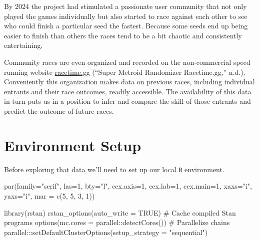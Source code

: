 \documentclass[
  letterpaper,
  DIV=11,
  numbers=noendperiod]{scrartcl}
\newenvironment{Shaded}{\begin{snugshade}}{\end{snugshade}}
\newcommand{\AttributeTok}[1]{\textcolor[rgb]{0.40,0.45,0.13}{#1}}
\newcommand{\CommentTok}[1]{\textcolor[rgb]{0.37,0.37,0.37}{#1}}
\newcommand{\ConstantTok}[1]{\textcolor[rgb]{0.56,0.35,0.01}{#1}}
\newcommand{\DecValTok}[1]{\textcolor[rgb]{0.68,0.00,0.00}{#1}}
\newcommand{\FunctionTok}[1]{\textcolor[rgb]{0.28,0.35,0.67}{#1}}
\newcommand{\NormalTok}[1]{\textcolor[rgb]{0.00,0.23,0.31}{#1}}
\newcommand{\SpecialCharTok}[1]{\textcolor[rgb]{0.37,0.37,0.37}{#1}}
\newcommand{\StringTok}[1]{\textcolor[rgb]{0.13,0.47,0.30}{#1}}
\begin{document}
By 2024 the project had stimulated a passionate user community that not
only played the games individually but also started to race against each
other to see who could finish a particular seed the fastest. Because
some seeds end up being easier to finish than others the races tend to
be a bit chaotic and consistently entertaining.

Community races are even organized and recorded on the non-commercial
speed running website \href{https://racetime.gg/smr}{racetime.gg}
({``Super Metroid Randomizer \textbar{} Racetime.gg,''} n.d.).
Conveniently this organization makes data on previous races, including
individual entrants and their race outcomes, readily accessible. The
availability of this data in turn puts us in a position to infer and
compare the skill of those entrants and predict the outcome of future
races.

\section{Environment Setup}\label{environment-setup}

Before exploring that data we'll need to set up our local \texttt{R}
environment.

\begin{Shaded}
\begin{Highlighting}[]
\FunctionTok{par}\NormalTok{(}\AttributeTok{family=}\StringTok{"serif"}\NormalTok{, }\AttributeTok{las=}\DecValTok{1}\NormalTok{, }\AttributeTok{bty=}\StringTok{"l"}\NormalTok{,}
    \AttributeTok{cex.axis=}\DecValTok{1}\NormalTok{, }\AttributeTok{cex.lab=}\DecValTok{1}\NormalTok{, }\AttributeTok{cex.main=}\DecValTok{1}\NormalTok{,}
    \AttributeTok{xaxs=}\StringTok{"i"}\NormalTok{, }\AttributeTok{yaxs=}\StringTok{"i"}\NormalTok{, }\AttributeTok{mar =} \FunctionTok{c}\NormalTok{(}\DecValTok{5}\NormalTok{, }\DecValTok{5}\NormalTok{, }\DecValTok{3}\NormalTok{, }\DecValTok{1}\NormalTok{))}

\FunctionTok{library}\NormalTok{(rstan)}
\FunctionTok{rstan\_options}\NormalTok{(}\AttributeTok{auto\_write =} \ConstantTok{TRUE}\NormalTok{)            }\CommentTok{\# Cache compiled Stan programs}
\FunctionTok{options}\NormalTok{(}\AttributeTok{mc.cores =}\NormalTok{ parallel}\SpecialCharTok{::}\FunctionTok{detectCores}\NormalTok{()) }\CommentTok{\# Parallelize chains}
\NormalTok{parallel}\SpecialCharTok{:::}\FunctionTok{setDefaultClusterOptions}\NormalTok{(}\AttributeTok{setup\_strategy =} \StringTok{"sequential"}\NormalTok{)}
\end{Highlighting}
\end{Shaded}
\end{document}
